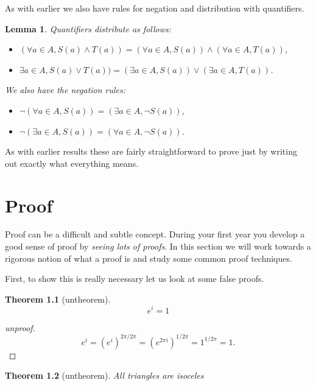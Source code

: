 \documentclass[
]{book}
\newtheorem{theorem}{Theorem}[chapter]
\newtheorem{lemma}{Lemma}[chapter]
\theoremstyle{definition}
\theoremstyle{definition}
\theoremstyle{definition}
\theoremstyle{definition}
\theoremstyle{remark}
\begin{document}
As with earlier we also have rules for negation and distribution with quantifiers.

\begin{lemma}

Quantifiers distribute as follows:

\begin{itemize}
\item
  \((\forall a \in A, S(a)\wedge T(a)) = (\forall a \in A, S(a))\wedge(\forall a \in A, T(a))\),
\item
  \(\exists a \in A, S(a)\vee T(a)) = (\exists a \in A, S(a))\vee (\exists a \in A, T(a))\).
\end{itemize}

We also have the negation rules:

\begin{itemize}
\item
  \(\neg(\forall a \in A, S(a))= (\exists a \in A, \neg S(a))\),
\item
  \(\neg(\exists a \in A, S(a)) = (\forall a \in A, \neg S(a))\).
\end{itemize}

\end{lemma}

As with earlier results these are fairly straightforward to prove just by writing out exactly what everything means.

\chapter{Proof}\label{proof}

Proof can be a difficult and subtle concept. During your first year you develop a good sense of proof by \emph{seeing lots of proofs}. In this section we will work towards a rigorous notion of what a proof is and study some common proof techniques.

First, to show this is really necessary let us look at some false proofs.

\begin{theorem}[untheorem]
\[e^i =1\]
\end{theorem}

\begin{proof}[unproof]
\[ e^i = (e^i)^{2\pi/2\pi} = (e^{2\pi i})^{1/2\pi} = 1^{1/2\pi} = 1.\]
\end{proof}

\begin{theorem}[untheorem]
All triangles are isoceles
\end{theorem}
\end{document}
